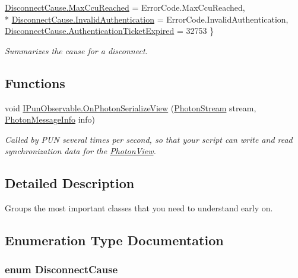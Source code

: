 \begin{DoxyCompactItemize}
\hyperlink{group__public_api_ggad61b1461cf60ad9e8d86923d111d5cc9a522f961eb7a2b35f0ef4b99b4ad3bb0a}{Disconnect\+Cause.\+Max\+Ccu\+Reached} = Error\+Code.\+Max\+Ccu\+Reached, 
\\*
\hyperlink{group__public_api_ggad61b1461cf60ad9e8d86923d111d5cc9ab67551dad56fc73fd4a580e810dc5f7f}{Disconnect\+Cause.\+Invalid\+Authentication} = Error\+Code.\+Invalid\+Authentication, 
\hyperlink{group__public_api_ggad61b1461cf60ad9e8d86923d111d5cc9a65537dc549af3f90695ff7cf0002b17b}{Disconnect\+Cause.\+Authentication\+Ticket\+Expired} = 32753
 \}\begin{DoxyCompactList}\small\item\em Summarizes the cause for a disconnect. \end{DoxyCompactList}
\end{DoxyCompactItemize}
\subsection*{Functions}
\begin{DoxyCompactItemize}
\item 
void \hyperlink{group__public_api_ga78c69bbb6f79d1e4fb23d3f761eaf4aa}{I\+Pun\+Observable.\+On\+Photon\+Serialize\+View} (\hyperlink{class_photon_stream}{Photon\+Stream} stream, \hyperlink{class_photon_message_info}{Photon\+Message\+Info} info)
\begin{DoxyCompactList}\small\item\em Called by P\+UN several times per second, so that your script can write and read synchronization data for the \hyperlink{class_photon_view}{Photon\+View}. \end{DoxyCompactList}\end{DoxyCompactItemize}


\subsection{Detailed Description}
Groups the most important classes that you need to understand early on. 



\subsection{Enumeration Type Documentation}
\subsubsection[{\texorpdfstring{Disconnect\+Cause}{DisconnectCause}}]{\setlength{\rightskip}{0pt plus 5cm}enum {\bf Disconnect\+Cause}\hspace{0.3cm}{\ttfamily [strong]}}\hypertarget{group__public_api_gad61b1461cf60ad9e8d86923d111d5cc9}{}\label{group__public_api_gad61b1461cf60ad9e8d86923d111d5cc9}


